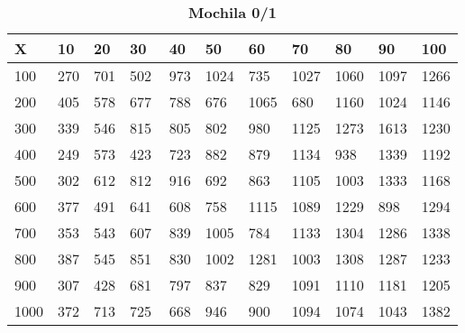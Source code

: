 \documentclass[10pt,letterpaper]{article}
\begin{document}
\newpage 
{}
\begin{center}
\begin{table}\renewcommand{\arraystretch}{2.5}
\caption{\large \textbf{Mochila 0/1}}
\centering
\begin{tabular} { |m{0.5cm}|m{1.3cm}|m{1.3cm}|m{1.3cm}|m{1.3cm}|m{1.3cm}|m{1.3cm}|m{1.3cm}|m{1.3cm}|m{1.3cm}|m{1.3cm}|} 
\hline
\rowcolor{Gray}
\centering \textbf{X} & \centering \textbf{10} & \centering \textbf{20} & \centering \textbf{30}\ & \centering \textbf{40} & \centering \textbf{50} & \centering \textbf{60}\ & \centering \textbf{70} & \centering \textbf{80} & \centering \textbf{90}\ & \textbf{100} \\\hline
\cellcolor{Gray}100 & \Large 270 & \Large 701 & \Large 502 & \Large 973 & \Large 1024 & \Large 735 & \Large 1027 & \Large 1060 & \Large 1097 & \Large 1266 \\
\hline
\cellcolor{Gray}200 & \Large 405 & \Large 578 & \Large 677 & \Large 788 & \Large 676 & \Large 1065 & \Large 680 & \Large 1160 & \Large 1024 & \Large 1146 \\
\hline
\cellcolor{Gray}300 & \Large 339 & \Large 546 & \Large 815 & \Large 805 & \Large 802 & \Large 980 & \Large 1125 & \Large 1273 & \Large 1613 & \Large 1230 \\
\hline
\cellcolor{Gray}400 & \Large 249 & \Large 573 & \Large 423 & \Large 723 & \Large 882 & \Large 879 & \Large 1134 & \Large 938 & \Large 1339 & \Large 1192 \\
\hline
\cellcolor{Gray}500 & \Large 302 & \Large 612 & \Large 812 & \Large 916 & \Large 692 & \Large 863 & \Large 1105 & \Large 1003 & \Large 1333 & \Large 1168 \\
\hline
\cellcolor{Gray}600 & \Large 377 & \Large 491 & \Large 641 & \Large 608 & \Large 758 & \Large 1115 & \Large 1089 & \Large 1229 & \Large 898 & \Large 1294 \\
\hline
\cellcolor{Gray}700 & \Large 353 & \Large 543 & \Large 607 & \Large 839 & \Large 1005 & \Large 784 & \Large 1133 & \Large 1304 & \Large 1286 & \Large 1338 \\
\hline
\cellcolor{Gray}800 & \Large 387 & \Large 545 & \Large 851 & \Large 830 & \Large 1002 & \Large 1281 & \Large 1003 & \Large 1308 & \Large 1287 & \Large 1233 \\
\hline
\cellcolor{Gray}900 & \Large 307 & \Large 428 & \Large 681 & \Large 797 & \Large 837 & \Large 829 & \Large 1091 & \Large 1110 & \Large 1181 & \Large 1205 \\
\hline
\cellcolor{Gray}1000 & \Large 372 & \Large 713 & \Large 725 & \Large 668 & \Large 946 & \Large 900 & \Large 1094 & \Large 1074 & \Large 1043 & \Large 1382 \\
\hline
\end{tabular} \\
\end{table}
\end{center}
\end{document}
